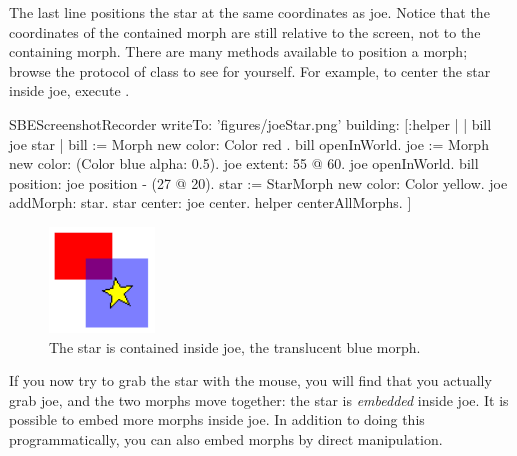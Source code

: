 \documentclass[a4paper,10pt,twoside]{book}
\begin{document}
\noindent
The last line positions the star at the same coordinates as joe.
Notice that the coordinates of the contained morph are still relative to the screen, not to the containing morph.
There are many  methods available to position a morph; browse the  protocol of class  to see for yourself.
For example, 
to center the star inside joe, execute   .

\begin{ExecuteSmalltalkScript}
SBEScreenshotRecorder writeTo: 'figures/joeStar.png' building: [:helper |
	| bill joe star |
	bill := Morph new color: Color red .
	bill openInWorld.
	joe := Morph new color: (Color blue alpha: 0.5).
	joe extent: 55 @ 60.
	joe openInWorld.
	bill position: joe position - (27 @ 20).
	star := StarMorph new color: Color yellow.
	joe addMorph: star.
	star center: joe center.
	helper centerAllMorphs.
]
\end{ExecuteSmalltalkScript}
\begin{figure}[ht]
	\centerline{\includegraphics{joeStar}}
	\caption{The star is contained inside joe, the translucent blue morph.
		\label{fig:joeStar}}
\end{figure}

If you now try to grab the star with the mouse, you will find that you actually grab joe, and the two morphs move together: the star is \emph{embedded} inside joe.
It is possible to embed more morphs inside joe.  
In addition to doing this programmatically, you can also embed morphs by direct manipulation.


\end{document}
